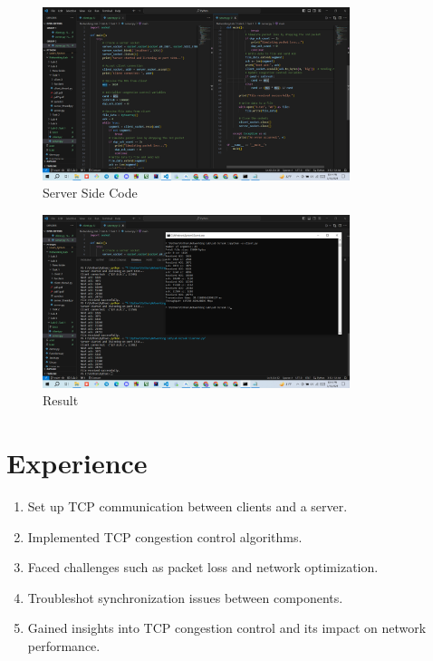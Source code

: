 \documentclass[11pt]{article}
\begin{document}
    \begin{figure}[H]
        \centering
        \includegraphics[width=0.8\textwidth]{Screenshot (179).png}
        \caption{Server Side Code}
        \label{fig:2}
    \end{figure}
    \begin{figure}[H]
        \centering
        \includegraphics[width=0.8\textwidth]{Screenshot (180).png}
        \caption{Result}
        \label{fig:2}
    \end{figure}
    
    


 

\section{Experience}

\begin{enumerate}
    \item Set up TCP communication between clients and a server.
    \item Implemented TCP congestion control algorithms.
    \item Faced challenges such as packet loss and network optimization.
    \item Troubleshot synchronization issues between components.
    \item Gained insights into TCP congestion control and its impact on network performance.
\end{enumerate}
\end{document}
